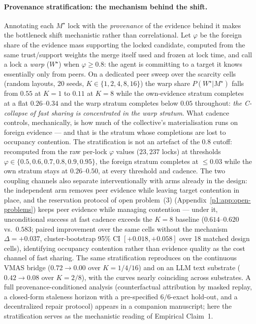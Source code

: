 \documentclass{article}
\begin{document}
\paragraph{Provenance stratification: the mechanism behind the shift.}
Annotating each $M^\star$ lock with the \emph{provenance} of the
evidence behind it makes the bottleneck shift mechanistic rather than
correlational. Let $\varphi$ be the foreign share of the evidence mass
supporting the locked candidate, computed from the same trust/support
weights the merge itself used and frozen at lock time, and call a lock
a \emph{warp} ($W^\star$) when $\varphi \ge 0.8$: the agent is
committing to a target it knows essentially only from peers. On a
dedicated peer sweep over the scarcity cells (random layouts, 20
seeds, $K\in\{1,2,4,8,16\}$) the warp share $P(W^\star|M^\star)$
falls from $0.55$ at $K{=}1$ to $0.11$ at $K{=}8$ while the
own-evidence stratum completes at a flat $0.26$--$0.34$ and the warp
stratum completes below $0.05$ throughout: \emph{the C-collapse of
fast sharing is concentrated in the warp stratum}. What cadence
controls, mechanically, is how much of the collective's
materialisation runs on foreign evidence --- and that is
the stratum whose completions are lost to occupancy contention. The stratification is not
an artefact of the $0.8$ cutoff: recomputed from the raw per-lock
$\varphi$ values ($23{,}237$ locks) at thresholds
$\varphi{\in}\{0.5,0.6,0.7,0.8,0.9,0.95\}$, the foreign stratum
completes at ${\le}0.03$ while the own stratum stays at
$0.26$--$0.50$, at every threshold and cadence. The two coupling
channels also separate interventionally with arms already in the
design: the independent arm removes peer evidence while leaving
target contention in place, and the reservation protocol of open
problem~(3) (Appendix~\ref{p1:app:open-problems}) keeps peer evidence
while managing contention --- under it, unconditional success at fast
cadence exceeds the $K{=}8$ baseline ($0.614$--$0.620$ vs.\
$0.583$; paired improvement over the same cells without the mechanism
$\Delta=+0.037$, cluster-bootstrap 95\% CI $[+0.018,+0.058]$ over 18
matched design cells), identifying occupancy contention rather than
evidence quality as the cost channel of fast sharing. The same stratification
reproduces on the continuous VMAS bridge ($0.72\to0.00$ over
$K{=}1/4/16$) and on an LLM text substrate ($0.42\to0.08$ over
$K{=}2/8$), with the curves nearly coinciding across substrates. A
full provenance-conditioned analysis (counterfactual attribution by
masked replay, a closed-form staleness horizon with a pre-specified
$6/6$-exact hold-out, and a decentralized repair protocol) appears in
a companion manuscript; here the stratification serves as the
mechanistic reading of Empirical Claim~1.
\end{document}
